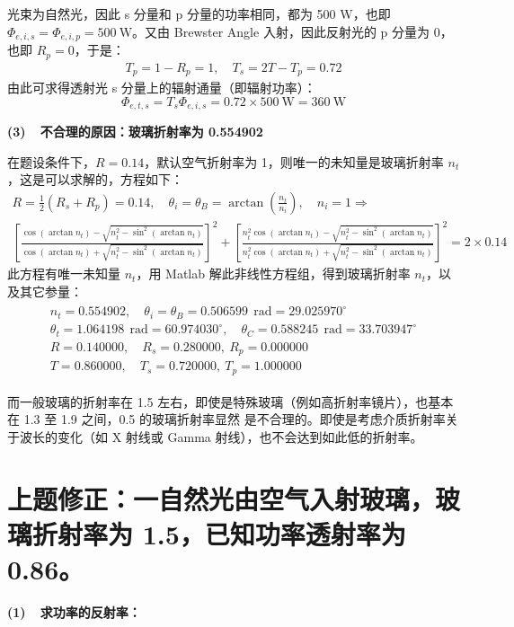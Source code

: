 \documentclass[a4paper]{article}  %
\theoremstyle{MyLineTheoremStyle} %
\theoremstyle{MyBlockTheoremStyle} %
\theoremstyle{MySubsubsectionStyle} %
\begin{document}
\begin{multicols*}{4}
光束为自然光，因此 s 分量和 p 分量的功率相同，都为 500 W，也即 $\Phi_{e,i,s} = \Phi_{e,i,p} = 500 \ \mathrm{W}$。又由 Brewster Angle 入射，因此反射光的 p 分量为 0，也即 $R_p = 0$，于是：
\begin{gather}
T_p = 1 - R_p = 1,\quad T_s = 2T - T_p = 0.72 
\end{gather}
由此可求得透射光 s 分量上的辐射通量（即辐射功率）：
\begin{equation}
\Phi_{e,t,s} = T_s \Phi_{e,i,s} = 0.72 \times 500 \ \mathrm{W} =  360 \ \mathrm{W}
\end{equation}

{\color{red} \textbf{(3)\ \ 不合理的原因：玻璃折射率为 0.554902}}

在题设条件下，$R = 0.14$，默认空气折射率为 1，则唯一的未知量是玻璃折射率 $n_t$，这是可以求解的，方程如下：
\begin{gather}\label{题设不合理}
    R = \frac{1}{2}(R_s + R_p) = 0.14,\quad \theta_i = \theta_B = \arctan\left(\frac{n_t}{n_i}\right) ,\quad n_i = 1
    \Longrightarrow \\ 
    \left[ \frac{ \cos (\arctan n_t) - \sqrt{n_{t}^2 - \sin^2 (\arctan n_t)} }{\cos (\arctan n_t) + \sqrt{n_{t}^2 - \sin^2 (\arctan n_t)}} \right]^2 + \left[ \frac{ n_{t}^2\cos (\arctan n_t) - \sqrt{n_{t}^2 - \sin^2 (\arctan n_t)} }{n_{t}^2\cos (\arctan n_t) + \sqrt{n_{t}^2 - \sin^2 (\arctan n_t)}} \right]^2  = 2\times 0.14
\end{gather}
此方程有唯一未知量 $n_t$，用 Matlab 解此非线性方程组，得到玻璃折射率 $n_t$，以及其它参量：
\begin{gather}
\begin{matrix}
    n_t = 0.554902 
    ,\quad 
    \theta_i = \theta_B = 0.506599\ \ \mathrm{rad}  = 29.025970^\circ
    \\
    \theta_t =  1.064198\ \ \mathrm{rad}  = 60.974030^\circ
    ,\quad 
    \theta_C =  0.588245\ \ \mathrm{rad}  = 33.703947^\circ
    \\
    R = 0.140000,\quad   R_s = 0.280000,\    R_p = 0.000000 \\ 
    T = 0.860000,\quad   T_s = 0.720000,\    T_p = 1.000000 
\end{matrix}
\end{gather}

而一般玻璃的折射率在 1.5 左右，即使是特殊玻璃（例如高折射率镜片），也基本在 1.3 至 1.9 之间，0.5 的玻璃折射率显然{\color{red} 是不合理的}。即使是考虑介质折射率关于波长的变化（如 X 射线或 Gamma 射线），也不会达到如此低的折射率。

\section{上题修正：一自然光由空气入射玻璃，玻璃折射率为 1.5，已知功率透射率为 0.86。}
\textbf{(1)\ \ 求功率的反射率：}


\end{multicols*}
\end{document}
